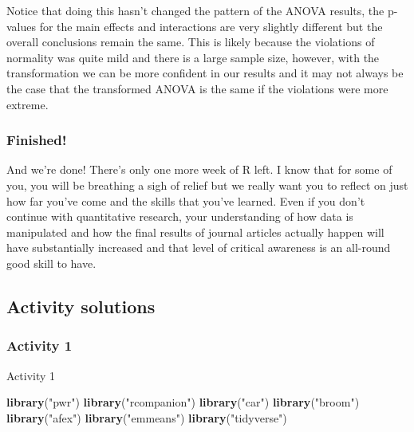 \documentclass[]{book}
\newenvironment{Shaded}{\begin{snugshade}}{\end{snugshade}}
\newcommand{\KeywordTok}[1]{\textcolor[rgb]{0.13,0.29,0.53}{\textbf{#1}}}
\newcommand{\NormalTok}[1]{#1}
\newcommand{\StringTok}[1]{\textcolor[rgb]{0.31,0.60,0.02}{#1}}
\begin{document}
Notice that doing this hasn't changed the pattern of the ANOVA results, the p-values for the main effects and interactions are very slightly different but the overall conclusions remain the same. This is likely because the violations of normality was quite mild and there is a large sample size, however, with the transformation we can be more confident in our results and it may not always be the case that the transformed ANOVA is the same if the violations were more extreme.

\hypertarget{finished-9}{%
\subsubsection{Finished!}\label{finished-9}}

And we're done! There's only one more week of R left. I know that for some of you, you will be breathing a sigh of relief but we really want you to reflect on just how far you've come and the skills that you've learned. Even if you don't continue with quantitative research, your understanding of how data is manipulated and how the final results of journal articles actually happen will have substantially increased and that level of critical awareness is an all-round good skill to have.

\hypertarget{activity-solutions-8}{%
\subsection{Activity solutions}\label{activity-solutions-8}}

\hypertarget{activity-1-6}{%
\subsubsection{Activity 1}\label{activity-1-6}}

Activity 1

\begin{Shaded}
\begin{Highlighting}[]
\KeywordTok{library}\NormalTok{(}\StringTok{"pwr"}\NormalTok{)}
\KeywordTok{library}\NormalTok{(}\StringTok{"rcompanion"}\NormalTok{)}
\KeywordTok{library}\NormalTok{(}\StringTok{"car"}\NormalTok{)}
\KeywordTok{library}\NormalTok{(}\StringTok{"broom"}\NormalTok{)}
\KeywordTok{library}\NormalTok{(}\StringTok{"afex"}\NormalTok{)}
\KeywordTok{library}\NormalTok{(}\StringTok{"emmeans"}\NormalTok{)}
\KeywordTok{library}\NormalTok{(}\StringTok{"tidyverse"}\NormalTok{)}
\end{Highlighting}
\end{Shaded}
\end{document}
